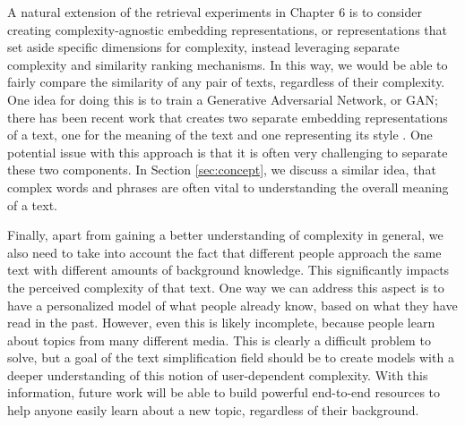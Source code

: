 \documentclass[thesis.tex]{subfiles}
\begin{document}
A natural extension of the retrieval experiments in Chapter 6 is to consider creating complexity-agnostic embedding representations, or representations that set aside specific dimensions for complexity, instead leveraging separate complexity and similarity ranking mechanisms. In this way, we would be able to fairly compare the similarity of any pair of texts, regardless of their complexity. One idea for doing this is to train a Generative Adversarial Network, or GAN; there has been recent work that creates two separate embedding representations of a text, one for the meaning of the text and one representing its style \citep{romanov2019adversarial}. One potential issue with this approach is that it is often very challenging to separate these two components. In Section \ref{sec:concept}, we discuss a similar idea, that complex words and phrases are often vital to understanding the overall meaning of a text. 

Finally, apart from gaining a better understanding of complexity in general, we also need to take into account the fact that different people approach the same text with different amounts of background knowledge. This significantly impacts the perceived complexity of that text. One way we can address this aspect is to have a personalized model of what people already know, based on what they have read in the past. However, even this is likely incomplete, because people learn about topics from many different media. This is clearly a difficult problem to solve, but a goal of the text simplification field should be to create models with a deeper understanding of this notion of user-dependent complexity. With this information, future work will be able to build powerful end-to-end resources to help anyone easily learn about a new topic, regardless of their background.

\biblio
\end{document}
